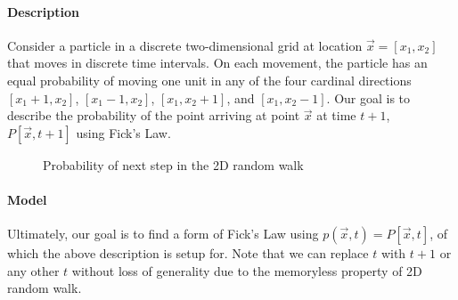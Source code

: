 

\paragraph{Description}
Consider a particle in a discrete two-dimensional grid at location $\vec{x}=[x_1,x_2]$ that moves in discrete time intervals. On each movement, the particle has an equal probability of moving one unit in any of the four cardinal directions $[x_1+1,x_2]$, $[x_1-1,x_2]$, $[x_1,x_2+1]$, and $[x_1,x_2-1]$. Our goal is to describe the probability of the point arriving at point $\vec{x}$ at time $t+1$, $P[\vec{x},t+1]$ using Fick's Law.

\begin{figure}[htb]
\centering
{}
\caption{Probability of next step in the 2D random walk}\label{2DrandomWalkProbs.fig}
\end{figure}
    
\paragraph{Model}
Ultimately, our goal is to find a form of Fick's Law using $p(\vec{x},t) = P[\vec{x},t]$, of which the above description is setup for. Note that we can replace $t$ with $t+1$ or any other $t$ without loss of generality due to the memoryless property of 2D random walk.

